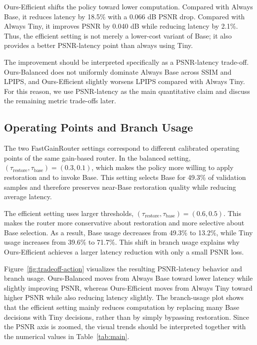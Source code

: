 \documentclass[11pt]{article}
\begin{document}
Ours-Efficient shifts the policy toward lower computation.
Compared with Always Base, it reduces latency by 18.5\% with a 0.066 dB PSNR drop.
Compared with Always Tiny, it improves PSNR by 0.040 dB while reducing latency by 2.1\%.
Thus, the efficient setting is not merely a lower-cost variant of Base; it also provides a better PSNR-latency point than always using Tiny.

The improvement should be interpreted specifically as a PSNR-latency trade-off.
Ours-Balanced does not uniformly dominate Always Base across SSIM and LPIPS, and Ours-Efficient slightly worsens LPIPS compared with Always Tiny.
For this reason, we use PSNR-latency as the main quantitative claim and discuss the remaining metric trade-offs later.

\subsection{Operating Points and Branch Usage}

The two FastGainRouter settings correspond to different calibrated operating points of the same gain-based router.
In the balanced setting, $(\tau_{\mathrm{restore}}, \tau_{\mathrm{base}})=(0.3,0.1)$, which makes the policy more willing to apply restoration and to invoke Base.
This setting selects Base for 49.3\% of validation samples and therefore preserves near-Base restoration quality while reducing average latency.

The efficient setting uses larger thresholds, $(\tau_{\mathrm{restore}}, \tau_{\mathrm{base}})=(0.6,0.5)$.
This makes the router more conservative about restoration and more selective about Base selection.
As a result, Base usage decreases from 49.3\% to 13.2\%, while Tiny usage increases from 39.6\% to 71.7\%.
This shift in branch usage explains why Ours-Efficient achieves a larger latency reduction with only a small PSNR loss.

Figure~\ref{fig:tradeoff-action} visualizes the resulting PSNR-latency behavior and branch usage.
Ours-Balanced moves from Always Base toward lower latency while slightly improving PSNR, whereas Ours-Efficient moves from Always Tiny toward higher PSNR while also reducing latency slightly.
The branch-usage plot shows that the efficient setting mainly reduces computation by replacing many Base decisions with Tiny decisions, rather than by simply bypassing restoration.
Since the PSNR axis is zoomed, the visual trends should be interpreted together with the numerical values in Table~\ref{tab:main}.
\end{document}
